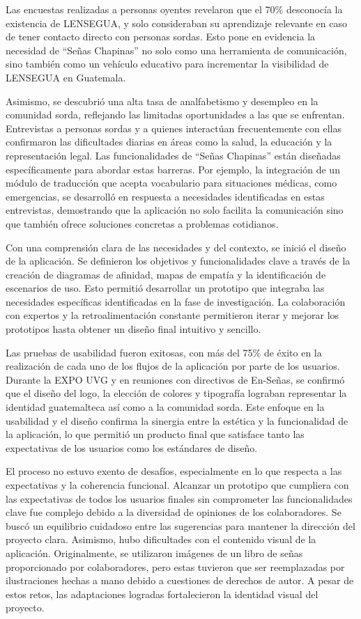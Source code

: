 Las encuestas realizadas a personas oyentes revelaron que el 70\% desconocía la existencia de LENSEGUA, y solo consideraban su aprendizaje relevante en caso de tener contacto directo con personas sordas. Esto pone en evidencia la necesidad de ``Señas Chapinas'' no solo como una herramienta de comunicación, sino también como un vehículo educativo para incrementar la visibilidad de LENSEGUA en Guatemala.

Asimismo, se descubrió una alta tasa de analfabetismo y desempleo en la comunidad sorda, reflejando las limitadas oportunidades a las que se enfrentan. Entrevistas a personas sordas y a quienes interactúan frecuentemente con ellas confirmaron las dificultades diarias en áreas como la salud, la educación y la representación legal. Las funcionalidades de ``Señas Chapinas'' están diseñadas específicamente para abordar estas barreras. Por ejemplo, la integración de un módulo de traducción que acepta vocabulario para situaciones médicas, como emergencias, se desarrolló en respuesta a necesidades identificadas en estas entrevistas, demostrando que la aplicación no solo facilita la comunicación sino que también ofrece soluciones concretas a problemas cotidianos.

Con una comprensión clara de las necesidades y del contexto, se inició el diseño de la aplicación. Se definieron los objetivos y funcionalidades clave a través de la creación de diagramas de afinidad, mapas de empatía y la identificación de escenarios de uso. Esto permitió desarrollar un prototipo que integraba las necesidades específicas identificadas en la fase de investigación. La colaboración con expertos y la retroalimentación constante permitieron iterar y mejorar los prototipos hasta obtener un diseño final intuitivo y sencillo.

Las pruebas de usabilidad fueron exitosas, con más del 75\% de éxito en la realización de cada uno de los flujos de la aplicación por parte de los usuarios. Durante la EXPO UVG y en reuniones con directivos de En-Señas, se confirmó que el diseño del logo, la elección de colores y tipografía lograban representar la identidad guatemalteca así como a la comunidad sorda. Este enfoque en la usabilidad y el diseño confirma la sinergia entre la estética y la funcionalidad de la aplicación, lo que permitió un producto final que satisface tanto las expectativas de los usuarios como los estándares de diseño.

El proceso no estuvo exento de desafíos, especialmente en lo que respecta a las expectativas y la coherencia funcional. Alcanzar un prototipo que cumpliera con las expectativas de todos los usuarios finales sin comprometer las funcionalidades clave fue complejo debido a la diversidad de opiniones de los colaboradores. Se buscó un equilibrio cuidadoso entre las sugerencias para mantener la dirección del proyecto clara. Asimismo, hubo dificultades con el contenido visual de la aplicación. Originalmente, se utilizaron imágenes de un libro de señas proporcionado por colaboradores, pero estas tuvieron que ser reemplazadas por ilustraciones hechas a mano debido a cuestiones de derechos de autor. A pesar de estos retos, las adaptaciones logradas fortalecieron la identidad visual del proyecto.


